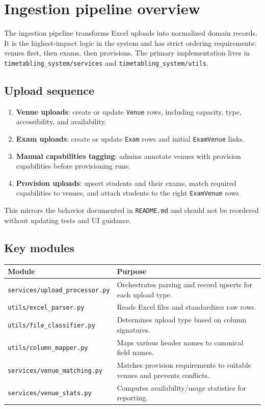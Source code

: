 \section{Ingestion pipeline overview}
\label{sec:ingestion}

The ingestion pipeline transforms Excel uploads into normalized domain records. It is the highest-impact logic in the system and has strict ordering requirements: venues first, then exams, then provisions. The primary implementation lives in \texttt{timetabling\_system/services} and \texttt{timetabling\_system/utils}.

\subsection{Upload sequence}
\label{subsec:ingestion:sequence}

\begin{enumerate}
  \item \textbf{Venue uploads}: create or update \texttt{Venue} rows, including capacity, type, accessibility, and availability.
  \item \textbf{Exam uploads}: create or update \texttt{Exam} rows and initial \texttt{ExamVenue} links.
  \item \textbf{Manual capabilities tagging}: admins annotate venues with provision capabilities before provisioning runs.
  \item \textbf{Provision uploads}: upsert students and their exams, match required capabilities to venues, and attach students to the right \texttt{ExamVenue} rows.
\end{enumerate}

This mirrors the behavior documented in \texttt{README.md} and should not be reordered without updating tests and UI guidance.

\subsection{Key modules}
\label{subsec:ingestion:modules}

\begin{longtable}{p{}p{}}
\toprule
\textbf{Module} & \textbf{Purpose} \\
\midrule
\texttt{services/upload\_processor.py} & Orchestrates parsing and record upserts for each upload type. \\
\texttt{utils/excel\_parser.py} & Reads Excel files and standardizes raw rows. \\
\texttt{utils/file\_classifier.py} & Determines upload type based on column signatures. \\
\texttt{utils/column\_mapper.py} & Maps various header names to canonical field names. \\
\texttt{services/venue\_matching.py} & Matches provision requirements to suitable venues and prevents conflicts. \\
\texttt{services/venue\_stats.py} & Computes availability/usage statistics for reporting. \\
\bottomrule
\end{longtable}

